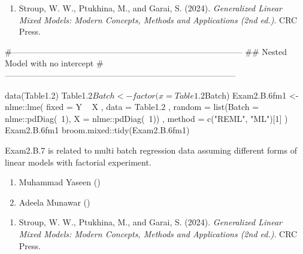 \documentclass[a4paper]{book}
\begin{document}
%
\begin{References}
\begin{enumerate}

\item{} Stroup, W. W., Ptukhina, M., and Garai, S. (2024).
\emph{Generalized Linear Mixed Models: Modern Concepts, Methods and Applications (2nd ed.)}.
CRC Press.

\end{enumerate}

\end{References}
%
\begin{SeeAlso}
\end{SeeAlso}
%
\begin{Examples}
\begin{ExampleCode}
#-----------------------------------------------------------------------------------
## Nested Model with no intercept
#-----------------------------------------------------------------------------------

data(Table1.2)
Table1.2$Batch <- factor(x = Table1.2$Batch)
Exam2.B.6fm1 <- nlme::lme(
      fixed       = Y ~ X
    , data        = Table1.2
    , random      = list(Batch = nlme::pdDiag(~1), X = nlme::pdDiag(~1))
    , method      = c("REML", "ML")[1]
    )
Exam2.B.6fm1
broom.mixed::tidy(Exam2.B.6fm1)
\end{ExampleCode}
\end{Examples}
%
\begin{Description}
Exam2.B.7 is related to multi batch regression data assuming different forms of linear models with factorial experiment.
\end{Description}
%
\begin{Author}
\begin{enumerate}

\item{}  Muhammad Yaseen ()
\item{} Adeela Munawar ()

\end{enumerate}

\end{Author}
%
\begin{References}
\begin{enumerate}

\item{} Stroup, W. W., Ptukhina, M., and Garai, S. (2024).
\emph{Generalized Linear Mixed Models: Modern Concepts, Methods and Applications (2nd ed.)}.
CRC Press.

\end{enumerate}

\end{References}
\end{document}
